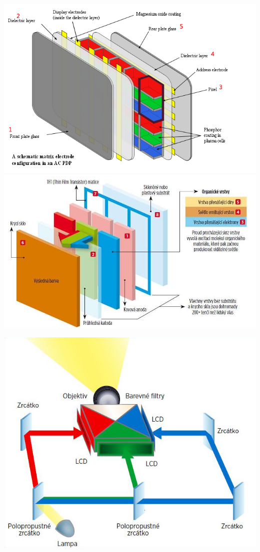 \begin{multicols}{2}
  \includegraphics[width=\linewidth]{TVY-POS/Vystupni-zobrazovaci-zarizeni/plasma.png}
  \columnbreak
  \includegraphics[width=\linewidth]{TVY-POS/Vystupni-zobrazovaci-zarizeni/oled.png}
\end{multicols}
\begin{center}
  \includegraphics[width=0.5\linewidth]{TVY-POS/Vystupni-zobrazovaci-zarizeni/lcd-projektor.jpg}
\end{center}
